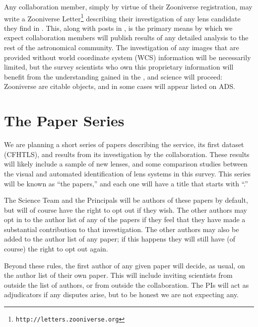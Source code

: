 \documentclass[a4paper]{article}
\begin{document}
Any \sw collaboration member, simply by virtue of their Zooniverse
registration, may write a Zooniverse
Letter\footnote{\texttt{http://letters.zooniverse.org}} describing their
investigation of any lens candidate they find in \sw. This, along with
posts in  \Talk, is the primary means by which we expect collaboration
members will publish results of any detailed analysis to the rest of the
astronomical community. The investigation of any \sw images that are
provided without world coordinate system (WCS) information will be
necessarily limited, but the survey scientists who own this proprietary
information will benefit from the understanding gained in the \sw
\Letters, and science will proceed: Zooniverse \Letters are citable
objects, and in some cases will appear listed on ADS. 



\section{The \SW Paper Series}
\label{sec:series}

We are planning a short series of papers describing the \sw service, its
first dataset (CFHTLS), and results from its investigation by the
collaboration. These results will likely include a sample of new lenses,
and some comparison studies between the visual and automated
identification of lens systems in this survey. This series will be known
as ``the \sw papers,'' and each one will have a title that starts with ``\sw.''

The Science Team and the Principals will be authors of these papers by
default, but will of course have the right to opt out if they wish. The
other authors may opt in to the author list of any of the \sw papers if
they feel that they have made a substantial contribution to that
investigation. The other authors may also be added to the author list of
any \sw paper; if this happens they will still have (of course) the
right to opt out again.

Beyond these rules, the first author of any given paper will decide, as
usual, on the author list of their own paper. This will include inviting
scientists from outside the list of authors, or from outside the
collaboration. The PIs will act as adjudicators if any disputes arise,
but to be honest we are not expecting any.


\end{document}
